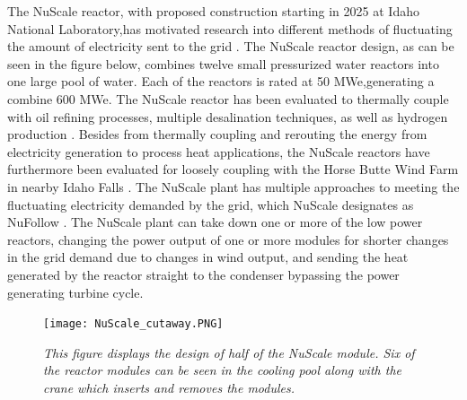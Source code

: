 \documentclass[12pt]{UIdahoMastersThesis}
\begin{document}
The NuScale reactor, with proposed construction starting in 2025 at Idaho National Laboratory,has motivated research into different methods of fluctuating the amount of electricity sent to the grid \cite{Ingersoll2014, Ingersoll2015, Ingersoll2016, Ingersoll2014_1}. The NuScale reactor design, as can be seen in the figure below, combines twelve small pressurized water reactors into one large pool of water.  Each of the reactors is rated at 50 MWe,generating a combine 600 MWe. The NuScale reactor has been evaluated to thermally couple with oil refining processes, multiple desalination techniques, as well as hydrogen production \cite{Ingersoll2014}. Besides from thermally coupling and rerouting the energy from electricity generation to process heat applications, the NuScale reactors have furthermore been evaluated for loosely coupling with the Horse Butte Wind Farm in nearby Idaho Falls \cite{Ingersoll2015}.  The NuScale plant has multiple approaches to meeting the fluctuating electricity demanded by the grid, which NuScale designates as NuFollow \cite{Ingersoll2015}.  The NuScale plant can take down one or more of the low power reactors, changing the power output of one or more modules for shorter changes in the grid demand due to changes in wind output, and sending the heat generated by the reactor straight to the condenser bypassing the power generating turbine cycle.
\begin{figure}
\texttt{[image: NuScale\_cutaway.PNG]}
\caption{\small \sl This figure displays the design of half of the NuScale module. Six of the reactor modules can be seen in the cooling pool along with the crane which inserts and removes the modules.}
\end{figure}
\end{document}
